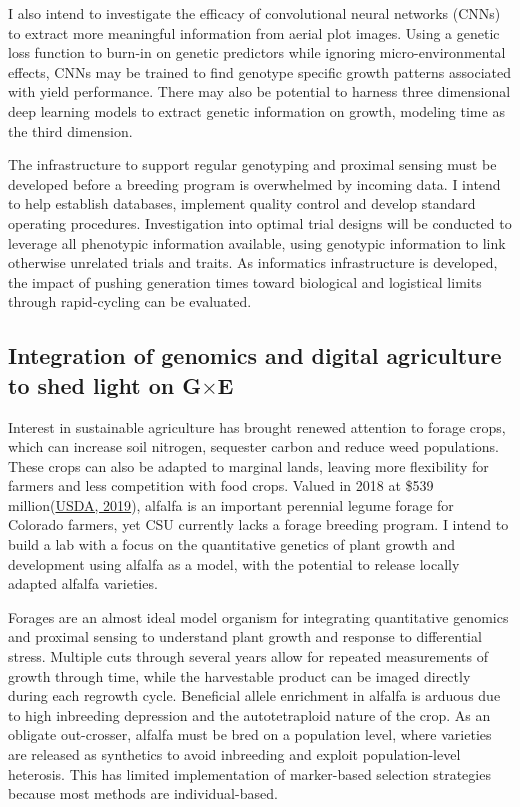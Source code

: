 \documentclass[11pt]{article}
\newcommand{\gxe}{G$\times$E}
\begin{document}
I also intend to investigate the efficacy of convolutional neural networks (CNNs) to extract more meaningful information from aerial plot images. Using a genetic loss function to burn-in on genetic predictors while ignoring micro-environmental effects, CNNs may be trained to find genotype specific growth patterns associated with yield performance. There may also be potential to harness three dimensional deep learning models to extract genetic information on growth, modeling time as the third dimension.

The infrastructure to support regular genotyping and proximal sensing must be developed before a breeding program is overwhelmed by incoming data. I intend to help establish databases, implement quality control and develop standard operating procedures. Investigation into optimal trial designs will be conducted to leverage all phenotypic information available, using genotypic information to link otherwise unrelated trials and traits. As informatics infrastructure is developed, the impact of pushing generation times toward biological and logistical limits through rapid-cycling can be evaluated. 

\subsection*{Integration of genomics and digital agriculture to shed light on \gxe}

Interest in sustainable agriculture has brought renewed attention to forage crops, which can increase soil nitrogen, sequester carbon and reduce weed populations. These crops can also be adapted to marginal lands, leaving more flexibility for farmers and less competition with food crops. Valued in 2018 at 
\$539 million(\href{https://www.nass.usda.gov/Quick_Stats/Ag_Overview/stateOverview.php?state=COLORADO}{USDA, 2019}), alfalfa is an important perennial legume forage for Colorado farmers, yet CSU currently lacks a forage breeding program. I intend to build a lab with a focus on the quantitative genetics of plant growth and development using alfalfa as a model, with the potential to release locally adapted alfalfa varieties.

Forages are an almost ideal model organism for integrating quantitative genomics and proximal sensing to understand plant growth and response to differential stress. Multiple cuts through several years allow for repeated measurements of growth through time, while the harvestable product can be imaged directly during each regrowth cycle.  Beneficial allele enrichment in alfalfa is arduous due to high inbreeding depression and the autotetraploid nature of the crop. As an obligate out-crosser, alfalfa must be bred on a population level, where varieties are released as synthetics to avoid inbreeding and exploit population-level heterosis. This has limited implementation of marker-based selection strategies because most methods are individual-based. 
\end{document}
